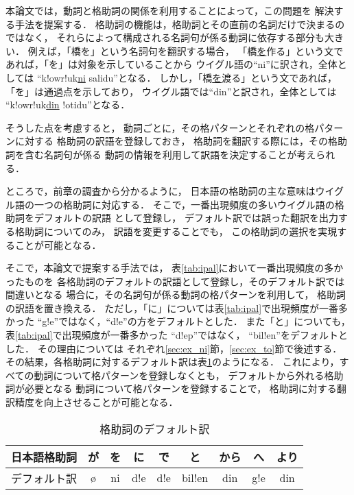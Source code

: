 本論文では，動詞と格助詞の関係を利用することによって，この問題を
解決する手法を提案する．
格助詞の機能は，格助詞とその直前の名詞だけで決まるのではなく，
それらによって構成される名詞句が係る動詞に依存する部分も大きい．
例えば，「橋を」という名詞句を翻訳する場合，
「橋\underline{を}作る」という文であれば，「を」は対象を示していることから
ウイグル語の``ni''に訳され，全体としては
``k!owr!uk\underline{ni} salidu''となる．
しかし，「橋\underline{を}渡る」という文であれば，「を」は通過点を示しており，
ウイグル語では``din''と訳され，全体としては
``k!owr!uk\underline{din} !otidu''となる．

そうした点を考慮すると，
動詞ごとに，その格パターンとそれぞれの格パターンに対する
格助詞の訳語を登録しておき，
格助詞を翻訳する際には，その格助詞を含む名詞句が係る
動詞の情報を利用して訳語を決定することが考えられる．

ところで，前章の調査から分かるように，
日本語の格助詞の主な意味はウイグル語の一つの格助詞に対応する．
そこで，一番出現頻度の多いウイグル語の格助詞をデフォルトの訳語
として登録し，
デフォルト訳では誤った翻訳を出力する格助詞についてのみ，
訳語を変更することでも，
この格助詞の選択を実現することが可能となる．

そこで，本論文で提案する手法では，
表\ref{tab:ipal}において一番出現頻度の多かったものを
各格助詞のデフォルトの訳語として登録し，そのデフォルト訳では間違いとなる
場合に，その名詞句が係る動詞の格パターンを利用して，
格助詞の訳語を置き換える．
ただし，「に」については表\ref{tab:ipal}で出現頻度が一番多かった
``g!e''ではなく，``d!e''の方をデフォルトとした．
また「と」についても，表\ref{tab:ipal}で出現頻度が一番多かった
``d!ep''ではなく， ``bil!en''をデフォルトとした．
その理由については
それぞれ\ref{sec:ex_ni}節，\ref{sec:ex_to}節で後述する．
その結果，各格助詞に対するデフォルト訳は表\ref{tab:default}のようになる．
これにより，すべての動詞について格パターンを登録しなくとも，
デフォルトから外れる格助詞が必要となる
動詞について格パターンを登録することで，
格助詞に対する翻訳精度を向上させることが可能となる．

\begin{table}
\caption{格助詞のデフォルト訳}
\label{tab:default}
\begin{center}
\begin{tabular}{l|cccccccc}
\hline
日本語格助詞 & が & を & に & で & と & から & へ & より\\
\hline
デフォルト訳 & \o & ni & d!e & d!e & bil!en & din & g!e & din \\
\hline
\end{tabular}
\end{center}
\end{table}

